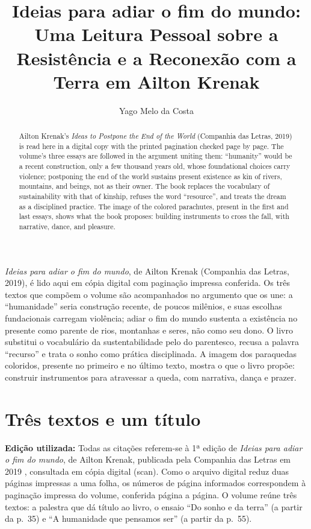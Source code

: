\documentclass[12pt]{article}
\title{Ideias para adiar o fim do mundo: Uma Leitura Pessoal sobre a Resistência e a Reconexão com a Terra em Ailton Krenak}
\author{Yago Melo da Costa}
\begin{document}
\maketitle

\begin{resumo}
\emph{Ideias para adiar o fim do mundo}, de Ailton Krenak (Companhia das Letras, 2019), é lido aqui em cópia digital com paginação impressa conferida. Os três textos que compõem o volume são acompanhados no argumento que os une: a ``humanidade'' seria construção recente, de poucos milênios, e suas escolhas fundacionais carregam violência; adiar o fim do mundo sustenta a existência no presente como parente de rios, montanhas e seres, não como seu dono. O livro substitui o vocabulário da sustentabilidade pelo do parentesco, recusa a palavra ``recurso'' e trata o sonho como prática disciplinada. A imagem dos paraquedas coloridos, presente no primeiro e no último texto, mostra o que o livro propõe: construir instrumentos para atravessar a queda, com narrativa, dança e prazer.
\end{resumo}

\begin{abstract}
Ailton Krenak's \emph{Ideas to Postpone the End of the World} (Companhia das Letras, 2019) is read here in a digital copy with the printed pagination checked page by page. The volume's three essays are followed in the argument uniting them: ``humanity'' would be a recent construction, only a few thousand years old, whose foundational choices carry violence; postponing the end of the world sustains present existence as kin of rivers, mountains, and beings, not as their owner. The book replaces the vocabulary of sustainability with that of kinship, refuses the word ``resource'', and treats the dream as a disciplined practice. The image of the colored parachutes, present in the first and last essays, shows what the book proposes: building instruments to cross the fall, with narrative, dance, and pleasure.
\end{abstract}

\section{Três textos e um título}

\noindent
\textbf{Edição utilizada:} Todas as citações referem-se à 1ª edição de \emph{Ideias para adiar o fim do mundo}, de Ailton Krenak, publicada pela Companhia das Letras em 2019 \cite{krenak2019}, consultada em cópia digital (scan). Como o arquivo digital reduz duas páginas impressas a uma folha, os números de página informados correspondem à paginação impressa do volume, conferida página a página. O volume reúne três textos: a palestra que dá título ao livro, o ensaio ``Do sonho e da terra'' (a partir da p.~35) e ``A humanidade que pensamos ser'' (a partir da p.~55).
\end{document}
